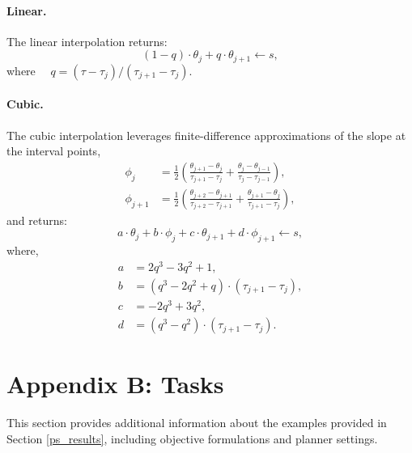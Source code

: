 \paragraph{Linear.}
The linear interpolation returns: 
\begin{equation}
	(1 - q) \cdot \theta_j + q \cdot \theta_{j+1} \leftarrow s,
\end{equation}
where $\quad q = (\tau - \tau_j) / (\tau_{j+1} - \tau_j)$.

\paragraph{Cubic.}
The cubic interpolation leverages finite-difference approximations of the slope at the interval points,
\begin{align}
	\phi_j &= \frac{1}{2} \left(\frac{\theta_{j+1} - \theta_j}{
		\tau_{j+1} - \tau_j} +
	\frac{\theta_j - \theta_{j-1}}{
		\tau_j - \tau_{j-1}} \right),\\
	\phi_{j+1} &= \frac{1}{2} \left(\frac{\theta_{j+2} - \theta_{j+1}}{
		\tau_{j+2} - \tau_{j+1}} +
	\frac{\theta_{j+1} - \theta_{j}}{
		\tau_{j+1} - \tau_{j}} \right),
\end{align}
and returns:
\begin{equation}
	a \cdot \theta_j + b \cdot \phi_j + c \cdot \theta_{j+1} + d \cdot \phi_{j+1} \leftarrow s,
\end{equation}
where,
\begin{align}
	a &= 2 q^3 - 3 q^2 + 1,\\
	b &= (q^3 - 2 q^2 + q) \cdot (\tau_{j+1} - \tau_j),\\
	c &= -2 q^3 + 3 q^2,\\
	d &= (q^3 - q^2) \cdot (\tau_{j+1} - \tau_j).
\end{align}

\section{Appendix B: Tasks}
This section provides additional information about the examples provided in Section \ref{ps_results}, including objective formulations and planner settings.

